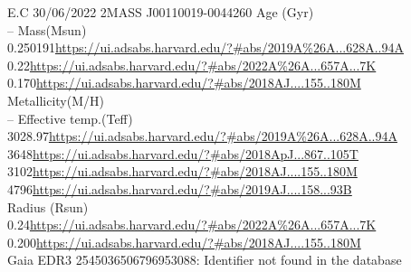 E.C 30/06/2022
2MASS J00110019-0044260
Age (Gyr)\\
--
Mass(Msun)\\
0.250191\url{https://ui.adsabs.harvard.edu/?#abs/2019A%26A...628A..94A}\\
0.22\url{https://ui.adsabs.harvard.edu/?#abs/2022A%26A...657A...7K}\\
0.170\url{https://ui.adsabs.harvard.edu/?#abs/2018AJ....155..180M}\\
Metallicity(M/H)\\
--
Effective temp.(Teff)\\
3028.97\url{https://ui.adsabs.harvard.edu/?#abs/2019A%26A...628A..94A}\\
3648\url{https://ui.adsabs.harvard.edu/?#abs/2018ApJ...867..105T}\\
3102\url{https://ui.adsabs.harvard.edu/?#abs/2018AJ....155..180M}\\
4796\url{https://ui.adsabs.harvard.edu/?#abs/2019AJ....158...93B}\\
Radius (Rsun)\\
0.24\url{https://ui.adsabs.harvard.edu/?#abs/2022A%26A...657A...7K}\\
0.200\url{https://ui.adsabs.harvard.edu/?#abs/2018AJ....155..180M}\\

Gaia EDR3 2545036506796953088: Identifier not found in the database 